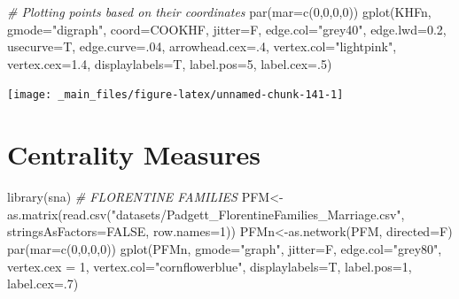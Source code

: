 \documentclass[
  notitlepage,
  onecolumn,
  openany]{book}
\newenvironment{Shaded}{\begin{snugshade}}{\end{snugshade}}
\newcommand{\AttributeTok}[1]{\textcolor[rgb]{0.77,0.63,0.00}{#1}}
\newcommand{\CommentTok}[1]{\textcolor[rgb]{0.56,0.35,0.01}{\textit{#1}}}
\newcommand{\ConstantTok}[1]{\textcolor[rgb]{0.00,0.00,0.00}{#1}}
\newcommand{\DecValTok}[1]{\textcolor[rgb]{0.00,0.00,0.81}{#1}}
\newcommand{\FloatTok}[1]{\textcolor[rgb]{0.00,0.00,0.81}{#1}}
\newcommand{\FunctionTok}[1]{\textcolor[rgb]{0.00,0.00,0.00}{#1}}
\newcommand{\NormalTok}[1]{#1}
\newcommand{\OtherTok}[1]{\textcolor[rgb]{0.56,0.35,0.01}{#1}}
\newcommand{\StringTok}[1]{\textcolor[rgb]{0.31,0.60,0.02}{#1}}
\begin{document}
\begin{Shaded}
\begin{Highlighting}[]
\CommentTok{\# Plotting points based on their coordinates}
\FunctionTok{par}\NormalTok{(}\AttributeTok{mar=}\FunctionTok{c}\NormalTok{(}\DecValTok{0}\NormalTok{,}\DecValTok{0}\NormalTok{,}\DecValTok{0}\NormalTok{,}\DecValTok{0}\NormalTok{))}
\FunctionTok{gplot}\NormalTok{(KHFn,}
      \AttributeTok{gmode=}\StringTok{"digraph"}\NormalTok{,  }
      \AttributeTok{coord=}\NormalTok{COOKHF,}
      \AttributeTok{jitter=}\NormalTok{F, }
      \AttributeTok{edge.col=}\StringTok{"grey40"}\NormalTok{,}
      \AttributeTok{edge.lwd=}\FloatTok{0.2}\NormalTok{,}
      \AttributeTok{usecurve=}\NormalTok{T,}
      \AttributeTok{edge.curve=}\NormalTok{.}\DecValTok{04}\NormalTok{, }
      \AttributeTok{arrowhead.cex=}\NormalTok{.}\DecValTok{4}\NormalTok{,}
      \AttributeTok{vertex.col=}\StringTok{"lightpink"}\NormalTok{,   }
      \AttributeTok{vertex.cex=}\FloatTok{1.4}\NormalTok{,}
      \AttributeTok{displaylabels=}\NormalTok{T,    }
      \AttributeTok{label.pos=}\DecValTok{5}\NormalTok{,        }
      \AttributeTok{label.cex=}\NormalTok{.}\DecValTok{5}\NormalTok{)       }
\end{Highlighting}
\end{Shaded}

\begin{center}\texttt{[image: \_main\_files/figure-latex/unnamed-chunk-141-1]} \end{center}

\hypertarget{centrality-measures}{%
\chapter{Centrality Measures}\label{centrality-measures}}

\begin{Shaded}
\begin{Highlighting}[]
\FunctionTok{library}\NormalTok{(sna)}
\CommentTok{\# FLORENTINE FAMILIES}
\NormalTok{PFM}\OtherTok{\textless{}{-}}\FunctionTok{as.matrix}\NormalTok{(}\FunctionTok{read.csv}\NormalTok{(}\StringTok{"datasets/Padgett\_FlorentineFamilies\_Marriage.csv"}\NormalTok{,}
                        \AttributeTok{stringsAsFactors=}\ConstantTok{FALSE}\NormalTok{, }\AttributeTok{row.names=}\DecValTok{1}\NormalTok{))}
\NormalTok{PFMn}\OtherTok{\textless{}{-}}\FunctionTok{as.network}\NormalTok{(PFM, }\AttributeTok{directed=}\NormalTok{F)}
\FunctionTok{par}\NormalTok{(}\AttributeTok{mar=}\FunctionTok{c}\NormalTok{(}\DecValTok{0}\NormalTok{,}\DecValTok{0}\NormalTok{,}\DecValTok{0}\NormalTok{,}\DecValTok{0}\NormalTok{))}
\FunctionTok{gplot}\NormalTok{(PFMn, }
      \AttributeTok{gmode=}\StringTok{"graph"}\NormalTok{,}
      \AttributeTok{jitter=}\NormalTok{F,}
      \AttributeTok{edge.col=}\StringTok{"grey80"}\NormalTok{,}
      \AttributeTok{vertex.cex =} \DecValTok{1}\NormalTok{,}
      \AttributeTok{vertex.col=}\StringTok{"cornflowerblue"}\NormalTok{,}
      \AttributeTok{displaylabels=}\NormalTok{T,}
      \AttributeTok{label.pos=}\DecValTok{1}\NormalTok{,}
      \AttributeTok{label.cex=}\NormalTok{.}\DecValTok{7}\NormalTok{)}
\end{Highlighting}
\end{Shaded}
\end{document}
